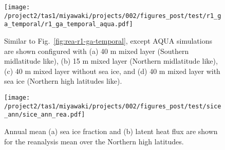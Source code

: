 \documentclass{ametsocV5}
\begin{document}

\begin{figure}
  \noindent\texttt{[image: /project2/tas1/miyawaki/projects/002/figures\_post/test/r1\_ga\_temporal/r1\_ga\_temporal\_aqua.pdf]}\\
    \caption{Similar to Fig.~\ref{fig:rea-r1-ga-temporal}, except AQUA simulations are shown configured with (a) 40 m mixed layer (Southern midlatitude like), (b) 15 m mixed layer (Northern midlatitude like), (c) 40 m mixed layer without sea ice, and (d) 40 m mixed layer with sea ice (Northern high latitudes like).}
    \label{fig:echam-r1-ga-temporal}
\end{figure}


\begin{figure}[t]
    \noindent\texttt{[image: /project2/tas1/miyawaki/projects/002/figures\_post/test/sice\_ann/sice\_ann\_rea.pdf]}\\
    \caption{Annual mean (a) sea ice fraction and (b) latent heat flux are shown for the reanalysis mean over the Northern high latitudes.}
    \label{fig:rea-sice}
\end{figure}
\end{document}

